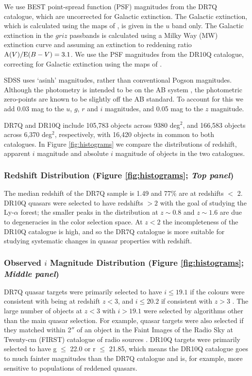 We use BEST point-spread function (PSF) magnitudes from the DR7Q catalogue, which are uncorrected for Galactic extinction. 
The Galactic extinction, which is calculated using the maps of \citet{schlegel98}, is given in the $u$ band only. The Galactic extinction in the $griz$ passbands is calculated using a Milky Way (MW) extinction curve \citep{pei92} and assuming an extinction to reddening ratio ${\rm A}(V) / {\rm E}(B-V) = 3.1$. 
We use the PSF magnitudes from the DR10Q catalogue, correcting for Galactic extinction using the maps of \citet{schlafly11}. 

SDSS uses `asinh' magnitudes, rather than conventional Pogson magnitudes. 
Although the photometry is intended to be on the AB system \citet{oke83}, the photometric zero-points are known to be slightly off the AB standard. 
To account for this we add 0.03 mag to the $u$, $g$, $r$ and $i$ magnitudes, and 0.05 mag to the $z$ magnitude.

DR7Q and DR10Q include 105,783 objects across 9380 deg$^2$, and 166,583 objects across 6,370 deg$^2$, respectively, with 16,420 objects in common to both catalogues. 
In Figure \ref{fig:histograms} we compare the distributions of redshift, apparent $i$ magnitude and absolute $i$ magnitude of objects in the two catalogues. 

\subsubsection{Redshift Distribution (Figure \ref{fig:histograms}; {\it Top panel})}

The median redshift of the DR7Q sample is 1.49 and 77\% are at redshifts $<$ 2. 
DR10Q quasars were selected to have redshifts $>2$ with the goal of studying the Ly-$\alpha$ forest; the smaller peaks in the distribution at $z \sim 0.8$ and $z \sim 1.6$ are due to degeneracies in the color selection space. At $z<2$ the incompleteness of the DR10Q catalogue is high, and so the DR7Q catalogue is more suitable for studying systematic changes in quasar properties with redshift. 

\subsubsection{Observed $i$ Magnitude Distribution (Figure \ref{fig:histograms}; {\it Middle panel})}

DR7Q quasar targets were primarily selected to have $i \leq 19.1$ if the colours were consistent with being at redshift $z < 3$, and $i \leq 20.2$ if consistent with $z > 3$ \citep{richards02}. 
The large number of objects at $z < 3$ with $i > 19.1$ were selected by algorithms other than the main quasar selection. 
For example, quasar targets were also selected if they matched within 2$''$ of an object in the Faint Images of the Radio Sky at Twenty-cm (FIRST) catalogue of radio sources \citep{becker95}. 
DR10Q targets were primarily selected to have g $\leq$ 22.0 or r $\leq$ 21.85, which means the DR10Q catalogue goes to much fainter magnitudes than the DR7Q catalogue and is, for example, more sensitive to populations of reddened quasars. 

